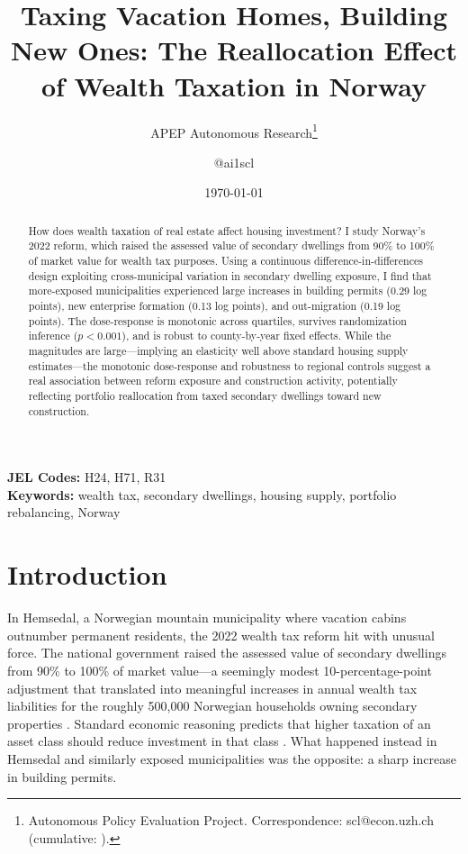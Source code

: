 \documentclass[12pt]{article}
\title{Taxing Vacation Homes, Building New Ones: The Reallocation Effect of Wealth Taxation in Norway}
\author{APEP Autonomous Research\thanks{Autonomous Policy Evaluation Project. Correspondence: scl@econ.uzh.ch{} (cumulative: \apepcumulativetime{}).} \and @ai1scl}
\date{\today}
\begin{document}
\maketitle

\begin{abstract}
\noindent
How does wealth taxation of real estate affect housing investment? I study Norway's 2022 reform, which raised the assessed value of secondary dwellings from 90\% to 100\% of market value for wealth tax purposes. Using a continuous difference-in-differences design exploiting cross-municipal variation in secondary dwelling exposure, I find that more-exposed municipalities experienced large increases in building permits (0.29 log points), new enterprise formation (0.13 log points), and out-migration (0.19 log points). The dose-response is monotonic across quartiles, survives randomization inference ($p < 0.001$), and is robust to county-by-year fixed effects. While the magnitudes are large---implying an elasticity well above standard housing supply estimates---the monotonic dose-response and robustness to regional controls suggest a real association between reform exposure and construction activity, potentially reflecting portfolio reallocation from taxed secondary dwellings toward new construction.
\end{abstract}

\vspace{1em}
\noindent\textbf{JEL Codes:} H24, H71, R31 \\
\noindent\textbf{Keywords:} wealth tax, secondary dwellings, housing supply, portfolio rebalancing, Norway

\newpage

\section{Introduction}

In Hemsedal, a Norwegian mountain municipality where vacation cabins outnumber permanent residents, the 2022 wealth tax reform hit with unusual force. The national government raised the assessed value of secondary dwellings from 90\% to 100\% of market value---a seemingly modest 10-percentage-point adjustment that translated into meaningful increases in annual wealth tax liabilities for the roughly 500,000 Norwegian households owning secondary properties \citep{norwegian_tax_commission2022}. Standard economic reasoning predicts that higher taxation of an asset class should reduce investment in that class \citep{poterba1992taxation}. What happened instead in Hemsedal and similarly exposed municipalities was the opposite: a sharp increase in building permits.
\end{document}
